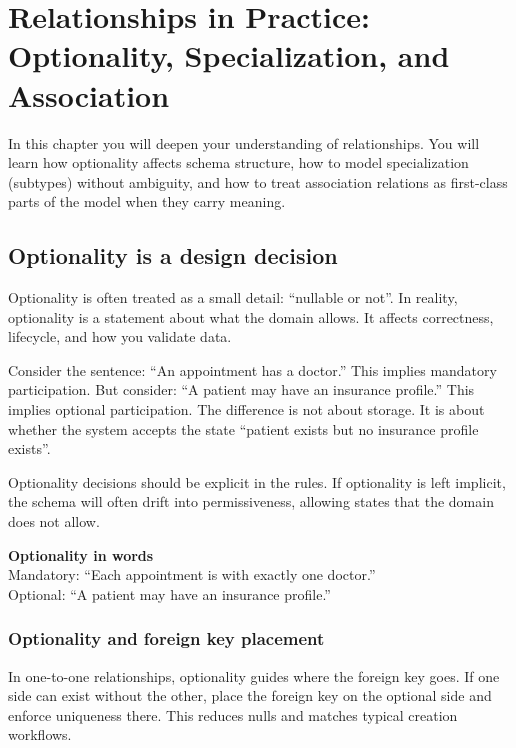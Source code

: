 \chapter{Relationships in Practice: Optionality, Specialization, and Association}

\begin{learningobjectives}
In this chapter you will deepen your understanding of relationships.
You will learn how optionality affects schema structure, how to model specialization (subtypes) without ambiguity, and how to treat association relations as first-class parts of the model when they carry meaning.
\end{learningobjectives}

\section{Optionality is a design decision}
Optionality is often treated as a small detail: “nullable or not”.
In reality, optionality is a statement about what the domain allows.
It affects correctness, lifecycle, and how you validate data.

Consider the sentence: “An appointment has a doctor.”
This implies mandatory participation.
But consider: “A patient may have an insurance profile.”
This implies optional participation.
The difference is not about storage.
It is about whether the system accepts the state “patient exists but no insurance profile exists”.

Optionality decisions should be explicit in the rules.
If optionality is left implicit, the schema will often drift into permissiveness, allowing states that the domain does not allow.

\begin{examplebox}
\textbf{Optionality in words}\\
Mandatory: “Each appointment is with exactly one doctor.”\\
Optional: “A patient may have an insurance profile.”
\end{examplebox}

\subsection{Optionality and foreign key placement}
In one-to-one relationships, optionality guides where the foreign key goes.
If one side can exist without the other, place the foreign key on the optional side and enforce uniqueness there.
This reduces nulls and matches typical creation workflows.

